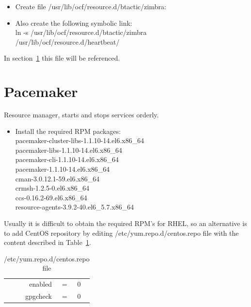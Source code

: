 \documentclass[a4paper, 12pt]{book}
\begin{document}
\begin{itemize}
	\item Create file /usr/lib/ocf/resource.d/btactic/zimbra:\\

	\item Also create the following symbolic link:\\
		ln  -s  /usr/lib/ocf/resource.d/btactic/zimbra  /usr/lib/ocf/resource.d/heartbeat/
\end{itemize}

\noindent In section~\ref{sec:pacemaker} this file will be referenced.



\section{Pacemaker}
\label{sec:pacemaker}

\noindent Resource manager, starts and stops services orderly.

\begin{itemize}
	\item Install the required RPM packages:\\
		pacemaker-cluster-libs-1.1.10-14.el6.x86\_64\\
		pacemaker-libs-1.1.10-14.el6.x86\_64\\
		pacemaker-cli-1.1.10-14.el6.x86\_64\\
		pacemaker-1.1.10-14.el6.x86\_64\\
		cman-3.0.12.1-59.el6.x86\_64\\
		crmsh-1.2.5-0.el6.x86\_64\\
		ccs-0.16.2-69.el6.x86\_64\\
		resource-agents-3.9.2-40.el6\_5.7.x86\_64
\end{itemize}

\noindent Usually it is difficult to obtain the required RPM's for RHEL, so an alternative is to add CentOS repository by editing /etc/yum.repo.d/centos.repo file with the content described in Table~\ref{table:centosrepo}.

\begin{table}
  \centering
  \begin{tabular}{ | r c l | }
    \hline
      enabled & = & 0\\
      gpgcheck & = & 0\\
    \hline
  \end{tabular}
\caption{/etc/yum.repo.d/centos.repo file}
\label{table:centosrepo}
\end{table}
\end{document}

